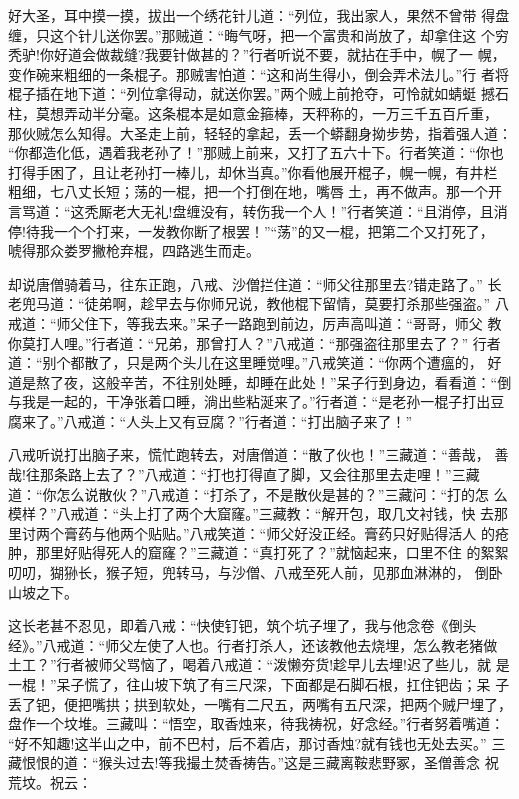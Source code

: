 好大圣，耳中摸一摸，拔出一个绣花针儿道：“列位，我出家人，果然不曾带
得盘缠，只这个针儿送你罢。”那贼道：“晦气呀，把一个富贵和尚放了，却拿住这
个穷秃驴!你好道会做裁缝?我要针做甚的？”行者听说不要，就拈在手中，幌了一
幌，变作碗来粗细的一条棍子。那贼害怕道：“这和尚生得小，倒会弄术法儿。”行
者将棍子插在地下道：“列位拿得动，就送你罢。”两个贼上前抢夺，可怜就如蜻蜓
撼石柱，莫想弄动半分毫。这条棍本是如意金箍棒，天秤称的，一万三千五百斤重，
那伙贼怎么知得。大圣走上前，轻轻的拿起，丢一个蟒翻身拗步势，指着强人道：
“你都造化低，遇着我老孙了！”那贼上前来，又打了五六十下。行者笑道：“你也
打得手困了，且让老孙打一棒儿，却休当真。”你看他展开棍子，幌一幌，有井栏
粗细，七八丈长短；荡的一棍，把一个打倒在地，嘴唇土，再不做声。那一个开
言骂道：“这秃厮老大无礼!盘缠没有，转伤我一个人！”行者笑道：“且消停，且消
停!待我一个个打来，一发教你断了根罢！”“荡”的又一棍，把第二个又打死了，
唬得那众娄罗撇枪弃棍，四路逃生而走。

却说唐僧骑着马，往东正跑，八戒、沙僧拦住道：“师父往那里去?错走路了。”
长老兜马道：“徒弟啊，趁早去与你师兄说，教他棍下留情，莫要打杀那些强盗。”
八戒道：“师父住下，等我去来。”呆子一路跑到前边，厉声高叫道：“哥哥，师父
教你莫打人哩。”行者道：“兄弟，那曾打人？”八戒道：“那强盗往那里去了？”
行者道：“别个都散了，只是两个头儿在这里睡觉哩。”八戒笑道：“你两个遭瘟的，
好道是熬了夜，这般辛苦，不往别处睡，却睡在此处！”呆子行到身边，看看道：“倒
与我是一起的，干净张着口睡，淌出些粘涎来了。”行者道：“是老孙一棍子打出豆
腐来了。”八戒道：“人头上又有豆腐？”行者道：“打出脑子来了！”

八戒听说打出脑子来，慌忙跑转去，对唐僧道：“散了伙也！”三藏道：“善哉，
善哉!往那条路上去了？”八戒道：“打也打得直了脚，又会往那里去走哩！”三藏
道：“你怎么说散伙？”八戒道：“打杀了，不是散伙是甚的？”三藏问：“打的怎
么模样？”八戒道：“头上打了两个大窟窿。”三藏教：“解开包，取几文衬钱，快
去那里讨两个膏药与他两个贴贴。”八戒笑道：“师父好没正经。膏药只好贴得活人
的疮肿，那里好贴得死人的窟窿？”三藏道：“真打死了？”就恼起来，口里不住
的絮絮叨叨，猢狲长，猴子短，兜转马，与沙僧、八戒至死人前，见那血淋淋的，
倒卧山坡之下。

这长老甚不忍见，即着八戒：“快使钉钯，筑个坑子埋了，我与他念卷《倒头
经》。”八戒道：“师父左使了人也。行者打杀人，还该教他去烧埋，怎么教老猪做
土工？”行者被师父骂恼了，喝着八戒道：“泼懒夯货!趁早儿去埋!迟了些儿，就
是一棍！”呆子慌了，往山坡下筑了有三尺深，下面都是石脚石根，扛住钯齿；呆
子丢了钯，便把嘴拱；拱到软处，一嘴有二尺五，两嘴有五尺深，把两个贼尸埋了，
盘作一个坟堆。三藏叫：“悟空，取香烛来，待我祷祝，好念经。”行者努着嘴道：
“好不知趣!这半山之中，前不巴村，后不着店，那讨香烛?就有钱也无处去买。”
三藏恨恨的道：“猴头过去!等我撮土焚香祷告。”这是三藏离鞍悲野冢，圣僧善念
祝荒坟。祝云：

